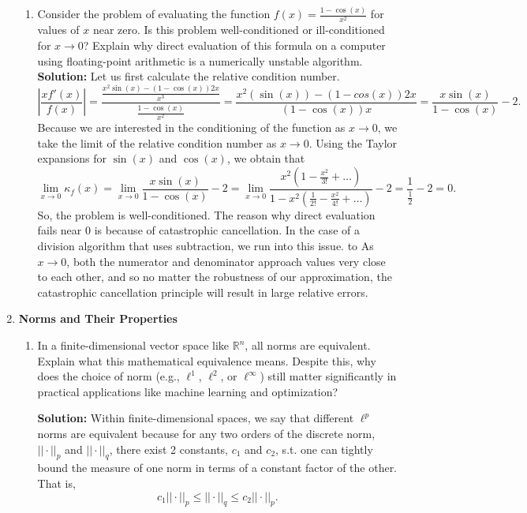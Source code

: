 \documentclass{article}
\theoremstyle{definition}
\theoremstyle{remark}
\begin{document}
\begin{enumerate}
\begin{enumerate}
        \item Consider the problem of evaluating the function $f(x) = \frac{1-\cos(x)}{x^2}$ for values of $x$ near zero. Is this problem well-conditioned or ill-conditioned for $x \to 0$? Explain why direct evaluation of this formula on a computer using floating-point arithmetic is a numerically unstable algorithm.\\

        \textbf{Solution:} Let us first calculate the relative condition number.
        \[
            \left|\frac{xf'(x)}{f(x)}\right| = \frac{\frac{x^{2}\sin(x)-(1-\cos(x))2x}{x^{3}}}{\frac{1-\cos(x)}{x^{2}}} = \frac{x^{2}(\sin(x))-(1-cos(x))2x}{(1-\cos(x))x} = \frac{x\sin(x)}{1-\cos(x)} -2  
        .\]
        Because we are interested in the conditioning of the function as \(x\to 0\), we take the limit of the relative condition number as \(x\to0\). Using the Taylor expansions for \(\sin(x)\) and \(\cos(x)\), we obtain that
        \[
            \lim_{ x \to 0 } \kappa_{f}(x) = \lim_{ x \to 0 } \frac{x\sin(x)}{1-\cos(x)} -2= \lim_{ x \to 0 } \frac{x^{2}\left(1 - \frac{x^{2}}{3!}+\dots\right)}{ 1-x^{2}\left(\frac{1}{2!}-\frac{x^{2}}{4!}+\dots\right)}-2 = \frac{1}{\frac{1}{2}} - 2 = 0
        .\]
        So, the problem is well-conditioned. The reason why direct evaluation fails near 0 is because of catastrophic cancellation. In the case of a division algorithm that uses subtraction, we run into this issue. to  As \(x\to 0\), both the numerator and denominator approach values very close to each other, and so no matter the robustness of our approximation, the catastrophic cancellation principle will result in large relative errors.
    \end{enumerate}

    \item \textbf{Norms and Their Properties}
    \begin{enumerate}
        \item In a finite-dimensional vector space like $\mathbb{R}^n$, all norms are equivalent. Explain what this mathematical equivalence means. Despite this, why does the choice of norm (e.g., $\ell^1$, $\ell^2$, or $\ell^\infty$) still matter significantly in practical applications like machine learning and optimization?

        \textbf{Solution:} Within finite-dimensional spaces, we say that different \(\ell^{p}\) norms are equivalent because for any two orders of the discrete norm, \(||\cdot||_{p}\) and \(||\cdot||_{q}\), there exist 2 constants, \(c_{1}\) and \(c_{2}\), s.t. one can tightly bound the measure of one norm in terms of a constant factor of the other. That is,
        \[
            c_{1}||\cdot||_{p} \leq ||\cdot||_{q} \leq c_{2} ||\cdot||_{p}
        .\]


\end{enumerate}
\end{enumerate}
\end{document}
